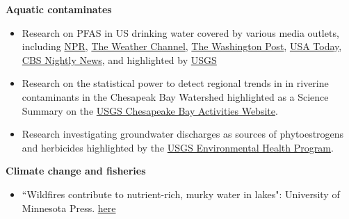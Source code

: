 \documentclass[10pt]{article}
\begin{document}
\begin{flushleft}
\textbf{Aquatic contaminates}\\
\begin{itemize}
	
\item Research on PFAS in US drinking water covered by various media outlets, including   \href{https://www.npr.org/2023/07/06/1186230007/drinking-water-forever-chemicals-pfas-study}{NPR}, \href{https://weather.com/health/video/forever-chemicals-may-be-in-45-of-us-tapwater}{The Weather Channel}, 
\href{https://www.washingtonpost.com/climate-environment/2023/07/06/tap-water-forever-chemicals-pfas/}{The Washington Post}, \href{https://www.usatoday.com/story/news/nation/2023/07/06/tap-water-united-states-pfas-forever-chemicals-risk-group/70384259007/}{USA Today}, 
\href{https://www.cbsnews.com/video/pfas-forever-chemicals-found-in-45-of-us-tap-water-study-says/}{CBS Nightly News}, 
and highlighted by \href{https://www.usgs.gov/news/national-news-release/tap-water-study-detects-pfas-forever-chemicals-across-us}{USGS}

\item Research on the statistical power to detect regional trends in in riverine contaminants in the Chesapeak Bay Watershed highlighted as a Science Summary on the \href{https://www.usgs.gov/centers/chesapeake-bay-activities/science/statistical-power-detect-regional-temporal-trends}{USGS Chesapeake Bay Activities Website}.

\item Research investigating groundwater discharges as sources of phytoestrogens and herbicides highlighted by the  \href{https://www.usgs.gov/ecosystems/environmental-health-program/science/groundwater-discharge-a-pathway-phytoestrogen-and?utm_source=Newsletter&utm_medium=Email&utm_campaign=geohealthusgs-newsletter-july-2021&utm_term=Title&qt-science_center_objects=0#qt-science_center_objects}{USGS Environmental Health Program}.
\end{itemize}

\textbf{Climate change and fisheries}\\
\begin{itemize}
	\vspace{5pt}
	
	\item ``Wildfires contribute to nutrient-rich, murky water in lakes": University of Minnesota Press. \href{https://twin-cities.umn.edu/news-events/wildfires-contribute-nutrient-rich-murky-water-lakes}{here}\\
	

\end{itemize}
\end{flushleft}
\end{document}
